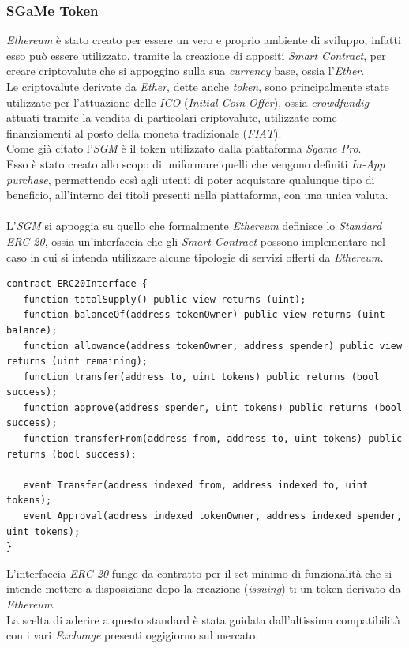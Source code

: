 \documentclass[11pt]{thesistemp}
\begin{document}
\subsubsection{SGaMe Token}

\textit{Ethereum} è stato creato per essere un vero e proprio ambiente di sviluppo, infatti esso può essere utilizzato, tramite la creazione di appositi \textit{Smart Contract}, per creare criptovalute che si appoggino sulla sua \textit{currency} base, ossia l'\textit{Ether}.\\
Le criptovalute derivate da \textit{Ether}, dette anche \textit{token}, sono principalmente state utilizzate per l'attuazione delle \textit{ICO} (\textit{Initial Coin Offer}), ossia \textit{crowdfundig} attuati tramite la vendita di particolari criptovalute, utilizzate come finanziamenti al posto della moneta tradizionale (\textit{FIAT}).\\
Come già citato l'\textit{SGM} è il token utilizzato dalla piattaforma \textit{Sgame Pro}.\\
Esso è stato creato allo scopo di uniformare quelli che vengono definiti \textit{In-App purchase}, permettendo così agli utenti di poter acquistare qualunque tipo di beneficio, all'interno dei titoli presenti nella piattaforma, con una unica valuta.\\\\
L'\textit{SGM} si appoggia su quello che formalmente \textit{Ethereum} definisce lo \textit{Standard ERC-20}, ossia un'interfaccia che gli \textit{Smart Contract} possono implementare nel caso in cui si intenda utilizzare alcune tipologie di servizi offerti da \textit{Ethereum.}
\begin{lstlisting}[language=Solidity]
contract ERC20Interface {
   function totalSupply() public view returns (uint);
   function balanceOf(address tokenOwner) public view returns (uint balance);
   function allowance(address tokenOwner, address spender) public view returns (uint remaining);
   function transfer(address to, uint tokens) public returns (bool success);
   function approve(address spender, uint tokens) public returns (bool success);
   function transferFrom(address from, address to, uint tokens) public returns (bool success);

   event Transfer(address indexed from, address indexed to, uint tokens);
   event Approval(address indexed tokenOwner, address indexed spender, uint tokens);
}
\end{lstlisting}
L'interfaccia \textit{ERC-20} funge da contratto per il set minimo di funzionalità che si intende mettere a disposizione dopo la creazione (\textit{issuing}) ti un token derivato da \textit{Ethereum}.\\
La scelta di aderire a questo standard è stata guidata dall'altissima compatibilità con i vari \textit{Exchange} presenti oggigiorno sul mercato.
\end{document}

